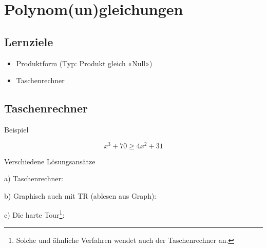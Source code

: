 
\section{Polynom(un)gleichungen}


\subsection*{Lernziele}

\begin{itemize}
\item Produktform (Typ: Produkt gleich «Null»)
\item Taschenrechner
\end{itemize}

\newpage


\newpage

\newpage

\subsection{Taschenrechner}
Beispiel

$$x^3 + 70 \ge{} 4x^2 + 31$$

Verschiedene Lösungsansätze



a) Taschenrechner: 

\leserluft{}

b) Graphisch auch mit TR (ablesen aus Graph):


  
c) Die harte Tour\footnote{Solche und ähnliche Verfahren wendet auch der
  Taschenrechner an.}:


